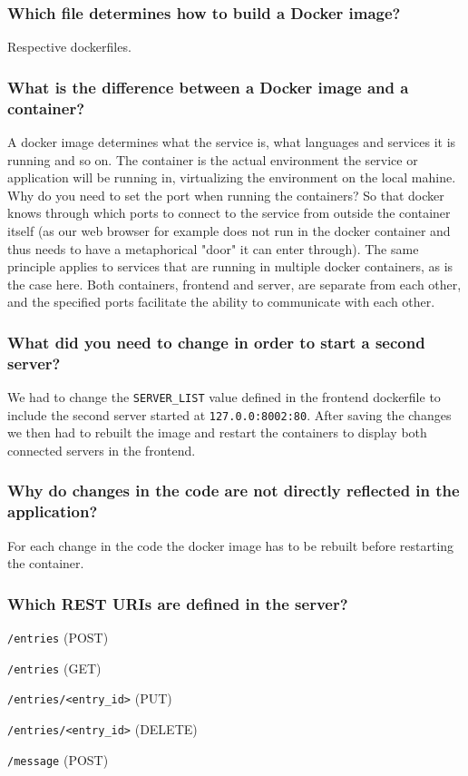 \documentclass[a4paper, 11pt]{article}   %
\begin{document}
\subsubsection*{Which file determines how to build a Docker image?}
Respective dockerfiles.
\subsubsection*{What is the difference between a Docker image and a container?}
A docker image determines what the service is, what languages and services 
it is running and so on. The container is the actual environment the service or 
application will be running in, virtualizing the environment on the local mahine.
Why do you need to set the port when running the containers?
So that docker knows through which ports to connect to the service from outside 
the container itself (as our web browser for example does not run in the 
docker container and thus needs to have a metaphorical "door" it can enter through).
The same principle applies to services that are running in multiple docker containers, 
as is the case here. Both containers, frontend and server, are separate from each other, 
and the specified ports facilitate the ability to communicate with each other.

\subsubsection*{What did you need to change in order to start a second server?}
We had to change the \verb|SERVER_LIST| value defined in the frontend dockerfile to 
include the second server started at \verb|127.0.0:8002:80|. After saving the changes we 
then had to rebuilt the image and restart the containers to display both connected servers 
in the frontend.

\subsubsection*{Why do changes in the code are not directly reflected in the application?}
For each change in the code the docker image has to be rebuilt before restarting 
the container. 

\subsubsection*{Which REST URIs are defined in the server?}
\begin{compactitem}
    \item \verb|/entries| (POST)
    \item \verb|/entries| (GET)
    \item \verb|/entries/<entry_id>| (PUT)
    \item \verb|/entries/<entry_id>| (DELETE)
    \item \verb|/message| (POST)
\end{compactitem}
\end{document}
